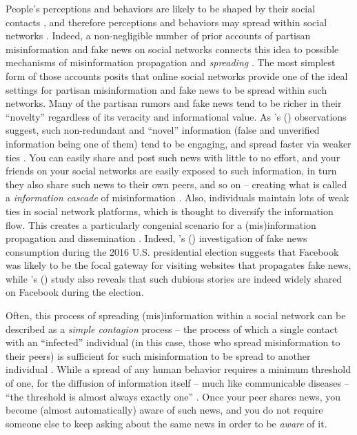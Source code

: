 \documentclass[man, 12pt, a4paper, nolmodern, noextraspace]{apa6}
\begin{document}
  People's perceptions and behaviors are likely to be shaped by their social contacts \parencite{lazer2010coevolution, centola2007complex}, and therefore perceptions and behaviors may spread within social networks \parencite[e.g.,][]{bond_61million}. Indeed, a non-negligible number of prior accounts of partisan misinformation and fake news on social networks connects this idea to possible mechanisms of misinformation propagation and \emph{spreading}  \parencite[e.g.,][]{del2016spreading, Bakshy_2012}. The most simplest form of those accounts posits that online social networks provide one of the ideal settings for partisan misinformation and fake news to be spread within such networks. Many of the partisan rumors and fake news tend to be richer in their \enquote{novelty} \parencite{wu2007novelty} regardless of its veracity and informational value. As \citeauthor{giglietto2016fakes}'s (\citeyear{giglietto2016fakes}) observations suggest, such non-redundant and \enquote{novel} information (false and unverified information being one of them) tend to be engaging, and spread faster via weaker ties \parencite{granovetter1977strength}. You can easily share and post such news with little to no effort, and your friends on your social networks are easily exposed to such information, in turn they also share such news to their own peers, and so on -- creating what is called a \emph{information cascade} of misinformation \parencite{del2016spreading}. Also, individuals maintain lots of weak ties in social network platforms, which is thought to diversify the information flow. This creates a particularly congenial scenario for a (mis)information propagation and dissemination \parencite{Bakshy_2012, granovetter1977strength}. Indeed, \citeauthor{guess2018selective}'s (\citeyear{guess2018selective}) investigation of fake news consumption during the 2016 U.S. presidential election suggests that Facebook was likely to be the focal gateway for visiting websites that propagates fake news, while \citeauthor{allcott2017social}'s (\citeyear{allcott2017social}) study also reveals that such dubious stories are indeed widely shared on Facebook during the election. 
    
    Often, this process of spreading (mis)information within a social network can be described as a \emph{simple contagion} process -- the process of which a single contact with an \enquote{infected} individual (in this case, those who spread misinformation to their peers) is sufficient for such misinformation to be spread to another individual \parencite{Monsted_plos2017, Centola2010Sience, siegel2009social}. While a spread of any human behavior requires a minimum threshold of one, for the diffusion of information itself -- much like communicable diseases -- \enquote{the threshold is almost always exactly one}  \parencites[][p. 706]{centola2007complex}[also see][]{Centola2010Sience}. Once your peer shares news, you become (almost automatically) aware of such news, and you do not require someone else to keep asking about the same news in order to be \emph{aware} of it.  
    
\end{document}
